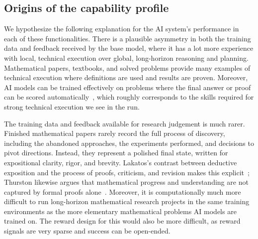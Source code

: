 
\subsection{Origins of the capability profile}
\label{sec:ai-origins}

We hypothesize the following explanation for the AI system's performance in each of these functionalities. There is a plausible asymmetry in both the training data and feedback received by the base model, where it has a lot more experience with local, technical execution over global, long-horizon reasoning and planning. Mathematical papers, textbooks, and solved problems provide many
examples of technical execution where definitions are used and results are proven. Moreover, AI models can be trained effectively on problems where the final answer or proof can be scored automatically~\cite{shao2024deepseekmath,hubert2026alphaproof}, which roughly corresponds to the skills required for strong technical execution we see in the run.


The training data and feedback available for research judgement is much rarer. Finished
mathematical papers rarely record the full process of discovery, including the abandoned approaches, the experiments performed, and decisions to pivot directions. Instead, they represent a polished final state, written for expositional clarity, rigor, and brevity. Lakatos's contrast between deductive exposition and the process of proofs,
criticism, and revision makes this explicit~\cite{lakatos1976proofs}; Thurston likewise argues that mathematical progress
and understanding are not captured by formal proofs alone~\cite{thurston1994proof}. Moreover, it is computationally much more difficult to run long-horizon mathematical research projects in the same training environments as the more elementary mathematical problems AI models are trained on. The reward design for this would also be more difficult, as reward signals are very sparse and success can be open-ended.

